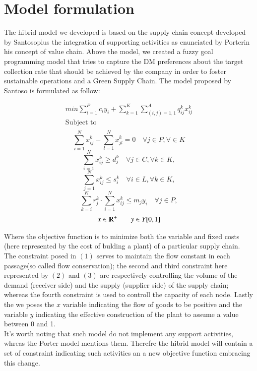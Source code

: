 \documentclass{article}
\begin{document}
\section{Model formulation}
The hibrid model we developed is based on the supply chain concept developed by Santoso\cite{Santoso_Ahmed_Goetschalckx_Shapiro_2005}plus the integration of supporting activities as enunciated by Porter\cite{CompetitiveAdvantage}in his concept of value chain. Above the model, we created a fuzzy goal programming model that tries to capture the  DM preferences about the target collection rate that should be achieved by the company in order to foster sustainable operations and a Green Supply Chain.
The model proposed by Santoso is formulated as follow:

\begin{equation*}
\begin{aligned}
	min \sum_{i=1}^{P} c_i y_i  + \sum_{k=1}^{K} \sum_{(i,j)=1,1}^{A} q_{ij}^{k}x_{ij}^{k}
  \\
  \text{Subject to}
  \\
\end{aligned}
\end{equation*}
\begin{equation}
  \sum_{i=1}^{N} x_{ij}^k - \sum_{l=1}^{N} x_{jl}^k = 0 \quad \forall j \in P, \forall \in K
\end{equation}
\begin{equation}
  \sum_{i=1}^{N} x_{ij}^k \geq d_{j}^k \quad \forall j \in C, \forall k \in K,
\end{equation}
\begin{equation}
  \sum_{j=1}^{N} x_{ij}^{k} \leq s_{i}^{k}  \quad \forall i \in L, \forall k \in K,
\end{equation}
\begin{equation}
\sum_{k=i}^{K} r_{j}^k \cdot \sum_{i=1}^{N}x_{ij}^k \leq m_j y_i \quad \forall j \in P,
\end{equation}
\begin{equation}
  x \in \varmathbb{R}^+ \quad \quad 
  y \in Y[0,1] 
\end{equation}

Where the objective function  is to minimize both the variable and fixed costs (here represented by the cost of bulding a plant) of a particular supply chain.
The constraint posed in $(1)$ serves to maintain the flow constant in each passage(so called flow conservation); the second and third constraint here represented by $(2)$ and $(3)$ are respectively controlling the volume of the demand (receiver side) and the supply (supplier side) of the supply chain; whereas the fourth constraint is used to controll the capacity of each node. Lastly the we poses the $x$ variable indicating the flow of goods to be positive and the variable $y$ indicating the effective construction of the plant to assume a value between 0 and 1. 
\\
It's worth noting that such model do not implement any support activities, whreas the Porter model mentions them. Therefre the hibrid model will contain a set of constraint indicating such activities an a new objective function embracing this change.
\end{document}
